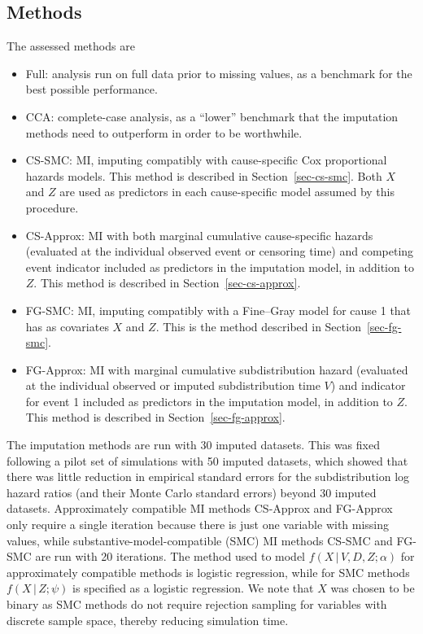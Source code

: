 \documentclass[
  letterpaper,
  DIV=11,
  numbers=noendperiod]{scrreprt}
\providecommand{\tightlist}{%
  \setlength{\itemsep}{0pt}\setlength{\parskip}{0pt}}\usepackage{longtable,booktabs,array}
\newcommand{\given}{\,|\,}
\begin{document}
\hypertarget{methods-1}{%
\subsection{Methods}\label{methods-1}}

The assessed methods are

\begin{itemize}
\tightlist
\item
  Full: analysis run on full data prior to missing values, as a
  benchmark for the best possible performance.
\item
  CCA: complete-case analysis, as a ``lower'' benchmark that the
  imputation methods need to outperform in order to be worthwhile.
\item
  CS-SMC: MI, imputing compatibly with cause-specific Cox proportional
  hazards models. This method is described in Section~\ref{sec-cs-smc}.
  Both \(X\) and \(Z\) are used as predictors in each cause-specific
  model assumed by this procedure.
\item
  CS-Approx: MI with both marginal cumulative cause-specific hazards
  (evaluated at the individual observed event or censoring time) and
  competing event indicator included as predictors in the imputation
  model, in addition to \(Z\). This method is described in
  Section~\ref{sec-cs-approx}.
\item
  FG-SMC: MI, imputing compatibly with a Fine--Gray model for cause 1
  that has as covariates \(X\) and \(Z\). This is the method described
  in Section~\ref{sec-fg-smc}.
\item
  FG-Approx: MI with marginal cumulative subdistribution hazard
  (evaluated at the individual observed or imputed subdistribution time
  \(V\)) and indicator for event 1 included as predictors in the
  imputation model, in addition to \(Z\). This method is described in
  Section~\ref{sec-fg-approx}.
\end{itemize}

The imputation methods are run with 30 imputed datasets. This was fixed
following a pilot set of simulations with 50 imputed datasets, which
showed that there was little reduction in empirical standard errors for
the subdistribution log hazard ratios (and their Monte Carlo standard
errors) beyond 30 imputed datasets. Approximately compatible MI methods
CS-Approx and FG-Approx only require a single iteration because there is
just one variable with missing values, while
substantive-model-compatible (SMC) MI methods CS-SMC and FG-SMC are run
with 20 iterations. The method used to model
\(f(X \given V, D, Z;\alpha)\) for approximately compatible methods is
logistic regression, while for SMC methods \(f(X \given Z;\psi)\) is
specified as a logistic regression. We note that \(X\) was chosen to be
binary as SMC methods do not require rejection sampling for variables
with discrete sample space, thereby reducing simulation time.
\end{document}
